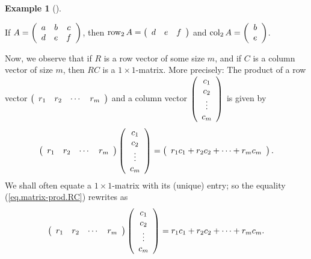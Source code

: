 \documentclass[numbers=enddot,12pt,final,onecolumn,notitlepage]{scrartcl}%
\theoremstyle{definition}
\newtheorem{exam}[theo]{Example}
\newenvironment{example}[1][]
{\begin{exam}[#1]\begin{leftbar}}
{\end{leftbar}\end{exam}}
\begin{document}
\begin{example}
If $A=\left(
\begin{array}
[c]{ccc}%
a & b & c\\
d & e & f
\end{array}
\right)  $, then $\operatorname*{row}\nolimits_{2}A=\left(
\begin{array}
[c]{ccc}%
d & e & f
\end{array}
\right)  $ and $\operatorname*{col}\nolimits_{2}A=\left(
\begin{array}
[c]{c}%
b\\
e
\end{array}
\right)  $.
\end{example}

Now, we observe that if $R$ is a row vector of some size $m$, and if $C$ is a
column vector of size $m$, then $RC$ is a $1\times1$-matrix. More precisely:
The product of a row vector $\left(
\begin{array}
[c]{cccc}%
r_{1} & r_{2} & \cdots & r_{m}%
\end{array}
\right)  $ and a column vector $\left(
\begin{array}
[c]{c}%
c_{1}\\
c_{2}\\
\vdots\\
c_{m}%
\end{array}
\right)  $ is given by
\begin{equation}
\left(
\begin{array}
[c]{cccc}%
r_{1} & r_{2} & \cdots & r_{m}%
\end{array}
\right)  \left(
\begin{array}
[c]{c}%
c_{1}\\
c_{2}\\
\vdots\\
c_{m}%
\end{array}
\right)  =\left(
\begin{array}
[c]{c}%
r_{1}c_{1}+r_{2}c_{2}+\cdots+r_{m}c_{m}%
\end{array}
\right)  . \label{eq.matrix-prod.RC}%
\end{equation}
We shall often equate a $1\times1$-matrix with its (unique) entry; so the
equality (\ref{eq.matrix-prod.RC}) rewrites as%
\begin{equation}
\left(
\begin{array}
[c]{cccc}%
r_{1} & r_{2} & \cdots & r_{m}%
\end{array}
\right)  \left(
\begin{array}
[c]{c}%
c_{1}\\
c_{2}\\
\vdots\\
c_{m}%
\end{array}
\right)  =r_{1}c_{1}+r_{2}c_{2}+\cdots+r_{m}c_{m}. \label{eq.matrix-prod.RC.1}%
\end{equation}
\end{document}
